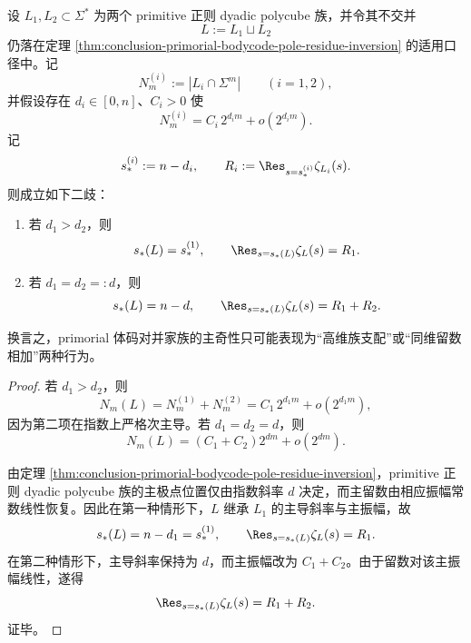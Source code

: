 \begin{theorem}\label{thm:conclusion-primorial-bodycode-union-pole-residue-selection}
设 \(L_1,L_2\subset \Sigma^\ast\) 为两个 primitive 正则 dyadic polycube 族，并令其不交并
\[
L:=L_1\sqcup L_2
\]
仍落在定理 \ref{thm:conclusion-primorial-bodycode-pole-residue-inversion} 的适用口径中。记
\[
N_m^{(i)}:=|L_i\cap \Sigma^m|
\qquad (i=1,2),
\]
并假设存在 \(d_i\in[0,n]\)、\(C_i>0\) 使
\[
N_m^{(i)}=C_i\,2^{d_i m}+o(2^{d_i m}).
\]
记
\[
s_\ast^{(i)}:=n-d_i,
\qquad
R_i:=\Res_{s=s_\ast^{(i)}}\zeta_{L_i}(s).
\]
则成立如下二歧：
\begin{enumerate}
  \item 若 \(d_1>d_2\)，则
  \[
  s_\ast(L)=s_\ast^{(1)},
  \qquad
  \Res_{s=s_\ast(L)}\zeta_L(s)=R_1.
  \]
  \item 若 \(d_1=d_2=:d\)，则
  \[
  s_\ast(L)=n-d,
  \qquad
  \Res_{s=s_\ast(L)}\zeta_L(s)=R_1+R_2.
  \]
\end{enumerate}
换言之，primorial 体码对并家族的主奇性只可能表现为“高维族支配”或“同维留数相加”两种行为。
\end{theorem}
\begin{proof}
若 \(d_1>d_2\)，则
\[
N_m(L)=N_m^{(1)}+N_m^{(2)}=C_1\,2^{d_1m}+o(2^{d_1m}),
\]
因为第二项在指数上严格次主导。若 \(d_1=d_2=d\)，则
\[
N_m(L)=(C_1+C_2)2^{dm}+o(2^{dm}).
\]

由定理 \ref{thm:conclusion-primorial-bodycode-pole-residue-inversion}，primitive 正则 dyadic polycube 族的主极点位置仅由指数斜率 \(d\) 决定，而主留数由相应振幅常数线性恢复。因此在第一种情形下，\(L\) 继承 \(L_1\) 的主导斜率与主振幅，故
\[
s_\ast(L)=n-d_1=s_\ast^{(1)},
\qquad
\Res_{s=s_\ast(L)}\zeta_L(s)=R_1.
\]
在第二种情形下，主导斜率保持为 \(d\)，而主振幅改为 \(C_1+C_2\)。由于留数对该主振幅线性，遂得
\[
\Res_{s=s_\ast(L)}\zeta_L(s)=R_1+R_2.
\]
证毕。
\end{proof}

